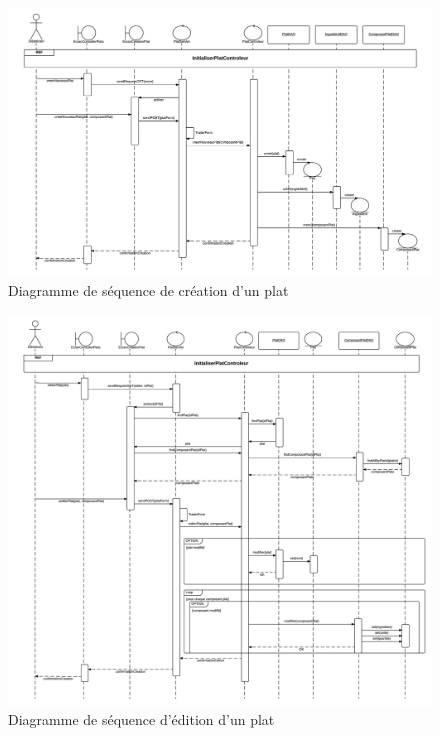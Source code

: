 \begin{figure}
\centering
\includegraphics[scale=0.45]{../../CasDUtilisations/CompositionPlat/sequence_CreerPlat.png}
\caption{Diagramme de séquence de création d'un plat}
\label{SequenceCreerPlat}
\end{figure}

\begin{figure}
\centering
\includegraphics[scale=0.45]{../../CasDUtilisations/CompositionPlat/sequence_EditerPlat.png}
\caption{Diagramme de séquence d'édition d'un plat}
\label{SequenceEditerPlat}
\end{figure}

